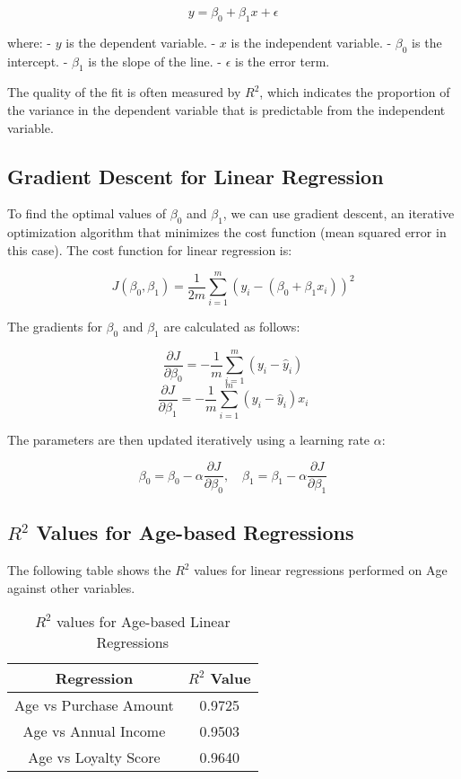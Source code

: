 \documentclass[11pt]{article}
\begin{document}
\[
y = \beta_0 + \beta_1 x + \epsilon
\]

where:
- \( y \) is the dependent variable.
- \( x \) is the independent variable.
- \( \beta_0 \) is the intercept.
- \( \beta_1 \) is the slope of the line.
- \( \epsilon \) is the error term.

The quality of the fit is often measured by \( R^2 \), which indicates the proportion of the variance in the dependent variable that is predictable from the independent variable.

\subsection{Gradient Descent for Linear Regression}

To find the optimal values of \( \beta_0 \) and \( \beta_1 \), we can use gradient descent, an iterative optimization algorithm that minimizes the cost function (mean squared error in this case). The cost function for linear regression is:

\[
J(\beta_0, \beta_1) = \frac{1}{2m} \sum_{i=1}^{m} \left( y_i - (\beta_0 + \beta_1 x_i) \right)^2
\]

The gradients for \( \beta_0 \) and \( \beta_1 \) are calculated as follows:

\[
\frac{\partial J}{\partial \beta_0} = -\frac{1}{m} \sum_{i=1}^{m} (y_i - \hat{y}_i)
\]
\[
\frac{\partial J}{\partial \beta_1} = -\frac{1}{m} \sum_{i=1}^{m} (y_i - \hat{y}_i) x_i
\]

The parameters are then updated iteratively using a learning rate \( \alpha \):

\[
\beta_0 = \beta_0 - \alpha \frac{\partial J}{\partial \beta_0}, \quad \beta_1 = \beta_1 - \alpha \frac{\partial J}{\partial \beta_1}
\]

\subsection{\( R^2 \) Values for Age-based Regressions}

The following table shows the \( R^2 \) values for linear regressions performed on Age against other variables.

\begin{table}[h!]
\centering
\begin{tabular}{|c|c|}
\hline
\textbf{Regression} & \textbf{\( R^2 \) Value} \\
\hline
Age vs Purchase Amount & 0.9725 \\
Age vs Annual Income & 0.9503 \\
Age vs Loyalty Score & 0.9640 \\
\hline
\end{tabular}
\caption{\( R^2 \) values for Age-based Linear Regressions}
\label{tab:R2_values}
\end{table}
\end{document}
